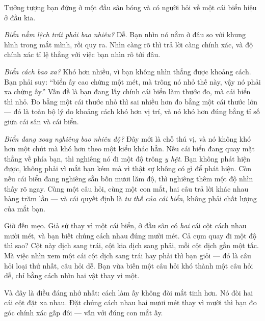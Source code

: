 \documentclass[../../marker.tex]{subfiles}
\begin{document}
\begin{dongian}
Tưởng tượng bạn đứng ở một đầu sân bóng và có người hỏi về một cái biển hiệu ở đầu kia.

\emph{Biển nằm lệch trái phải bao nhiêu?} Dễ. Bạn nhìn nó nằm ở đâu so với khung hình trong mắt mình, rồi quy ra. Nhìn càng rõ thì trả lời càng chính xác, và độ chính xác tỉ lệ thẳng với việc bạn nhìn rõ tới đâu.

\emph{Biển cách bao xa?} Khó hơn nhiều, vì bạn không nhìn thẳng được khoảng cách. Bạn phải suy: ``biển ấy cao chừng một mét, mà trông nó nhỏ thế này, vậy nó phải xa chừng ấy.'' Vấn đề là bạn đang lấy chính cái biển làm thước đo, mà cái biển thì nhỏ. Đo bằng một cái thước nhỏ thì sai nhiều hơn đo bằng một cái thước lớn --- đó là toàn bộ lý do khoảng cách khó hơn vị trí, và nó khó hơn đúng bằng tỉ số giữa cái sân và cái biển.

\emph{Biển đang xoay nghiêng bao nhiêu độ?} Đây mới là chỗ thú vị, và nó không khó hơn một chút mà khó hơn theo một kiểu khác hẳn. Nếu cái biển đang quay mặt thẳng về phía bạn, thì nghiêng nó đi một độ trông \emph{y hệt}. Bạn không phát hiện được, không phải vì mắt bạn kém mà vì thật sự không có gì để phát hiện. Còn nếu cái biển đang nghiêng sẵn bốn mươi lăm độ, thì nghiêng thêm một độ nhìn thấy rõ ngay. Cùng một câu hỏi, cùng một con mắt, hai câu trả lời khác nhau hàng trăm lần --- và cái quyết định là \emph{tư thế của cái biển}, không phải chất lượng của mắt bạn.

Giờ đến mẹo. Giả sử thay vì một cái biển, ở đầu sân có \emph{hai} cái cột cách nhau mười mét, và bạn biết chúng cách nhau đúng mười mét. Cả cụm quay đi một độ thì sao? Cột này dịch sang trái, cột kia dịch sang phải, mỗi cột dịch gần một tấc. Mà việc nhìn xem một cái cột dịch sang trái hay phải thì bạn giỏi --- đó là câu hỏi loại thứ nhất, câu hỏi dễ. Bạn vừa biến một câu hỏi khó thành một câu hỏi dễ, chỉ bằng cách nhìn hai vật thay vì một.

Và đây là điều đáng nhớ nhất: cách làm ấy không đòi mắt tinh hơn. Nó đòi hai cái cột đặt xa nhau. Đặt chúng cách nhau hai mươi mét thay vì mười thì bạn đo góc chính xác gấp đôi --- vẫn với đúng con mắt ấy.

\end{dongian}
\end{document}
